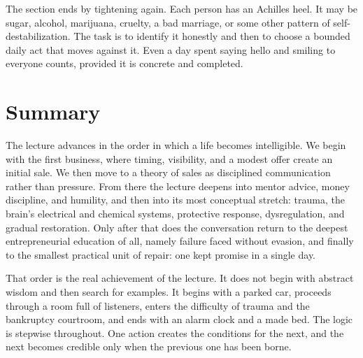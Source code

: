 The section ends by tightening again. Each person has an Achilles heel. It may be sugar, alcohol, marijuana, cruelty, a bad marriage, or some other pattern of self-destabilization. The task is to identify it honestly and then to choose a bounded daily act that moves against it. Even a day spent saying hello and smiling to everyone counts, provided it is concrete and completed.

\section{Summary}

The lecture advances in the order in which a life becomes intelligible. We begin with the first business, where timing, visibility, and a modest offer create an initial sale. We then move to a theory of sales as disciplined communication rather than pressure. From there the lecture deepens into mentor advice, money discipline, and humility, and then into its most conceptual stretch: trauma, the brain's electrical and chemical systems, protective response, dysregulation, and gradual restoration. Only after that does the conversation return to the deepest entrepreneurial education of all, namely failure faced without evasion, and finally to the smallest practical unit of repair: one kept promise in a single day.

That order is the real achievement of the lecture. It does not begin with abstract wisdom and then search for examples. It begins with a parked car, proceeds through a room full of listeners, enters the difficulty of trauma and the bankruptcy courtroom, and ends with an alarm clock and a made bed. The logic is stepwise throughout. One action creates the conditions for the next, and the next becomes credible only when the previous one has been borne.